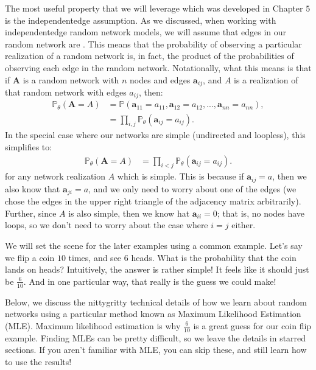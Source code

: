 \documentclass[letterpaper,10pt,english]{jupyterBook}
\begin{document}
\sphinxAtStartPar
The most useful property that we will leverage which was developed in Chapter \(5\) is the independent\sphinxhyphen{}edge assumption. As we discussed, when working with independent\sphinxhyphen{}edge random network models, we will assume that edges in our random network are . This means that the probability of observing a particular realization of a random network is, in fact, the product of the probabilities of observing each edge in the random network. Notationally, what this means is that if \(\mathbf A\) is a random network with \(n\) nodes and edges \(\mathbf a_{ij}\), and \(A\) is a realization of that random network with edges \(a_{ij}\), then:
\begin{align*}
    \mathbb P_\theta(\mathbf A = A) &= \mathbb P(\mathbf a_{11} = a_{11}, \mathbf a_{12} = a_{12}, ..., \mathbf a_{nn} = a_{nn}), \\
    &= \prod_{i, j} \mathbb P_\theta(\mathbf a_{ij} = a_{ij}).
\end{align*}
\sphinxAtStartPar
In the special case where our networks are simple (undirected and loopless), this simplifies to:
\begin{align*}
    \mathbb P_\theta(\mathbf A = A) &= \prod_{i < j} \mathbb P_\theta(\mathbf a_{ij} = a_{ij}).
\end{align*}
\sphinxAtStartPar
for any network realization \(A\) which is simple. This is because if \(\mathbf a_{ij} = a\), then we also know that \(\mathbf a_{ji} = a\), and we only need to worry about one of the edges (we chose the edges in the upper right triangle of the adjacency matrix arbitrarily).  Further, since \(A\) is also simple, then we know hat \(\mathbf a_{ii} = 0\); that is, no nodes have loops, so we don’t need to worry about the case where \(i = j\) either.

\sphinxAtStartPar
We will set the scene for the later examples using a common example. Let’s say we flip a coin \(10\) times, and see \(6\) heads. What is the probability that the coin lands on heads? Intuitively, the answer is rather simple! It feels like it should just be \(\frac{6}{10}\). And in one particular way, that really is the  guess we could make!

\sphinxAtStartPar
Below, we discuss the nitty\sphinxhyphen{}gritty technical details of how we learn about random networks using a particular method known as Maximum Likelihood Estimation (MLE). Maximum likelihood estimation is why \(\frac{6}{10}\) is a great guess for our coin flip example. Finding MLEs can be pretty difficult, so we leave the details in starred sections. If you aren’t familiar with MLE, you can skip these, and still learn how to use the results!
\end{document}
